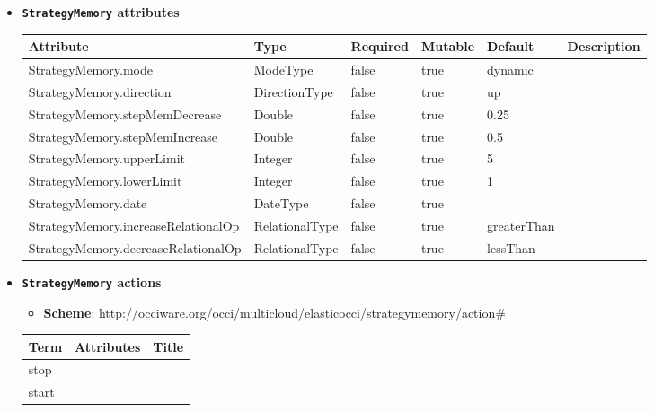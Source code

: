 \begin{itemize}
\item \textbf{\texttt{StrategyMemory} attributes}

\begin{tabularx}{\textwidth}{|l|l|p{1.4cm}|p{1.3cm}|l|X|}
  \hline
  \textbf{Attribute} & \textbf{Type} & \textbf{Required} & \textbf{Mutable} & \textbf{Default} & \textbf{Description} \\
  \hline  
  StrategyMemory.mode & ModeType & false & true & dynamic &  \\
  \hline
  StrategyMemory.direction & DirectionType & false & true & up &  \\
  \hline
  StrategyMemory.stepMemDecrease & Double & false & true & 0.25 &  \\
  \hline
  StrategyMemory.stepMemIncrease & Double & false & true & 0.5 &  \\
  \hline
  StrategyMemory.upperLimit & Integer & false & true & 5 &  \\
  \hline
  StrategyMemory.lowerLimit & Integer & false & true & 1 &  \\
  \hline
  StrategyMemory.date & DateType & false & true &  &  \\
  \hline
  StrategyMemory.increaseRelationalOp & RelationalType & false & true & greaterThan &  \\
  \hline
  StrategyMemory.decreaseRelationalOp & RelationalType & false & true & lessThan &  \\
  \hline
\end{tabularx}
\end{itemize}

\begin{itemize}
\item \textbf{\texttt{StrategyMemory} actions}

\begin{itemize}
	\item \textbf{Scheme}: http://occiware.org/occi/multicloud/elasticocci/strategymemory/action\#
\end{itemize}

\begin{center}
\begin{tabular}{|l|l|l|}
  \hline
  \textbf{Term}  & \textbf{Attributes} & \textbf{Title} \\
  \hline  
  stop & &  \\
  \hline
  start & &  \\
  \hline
\end{tabular}
\end{center}
\end{itemize}

 

